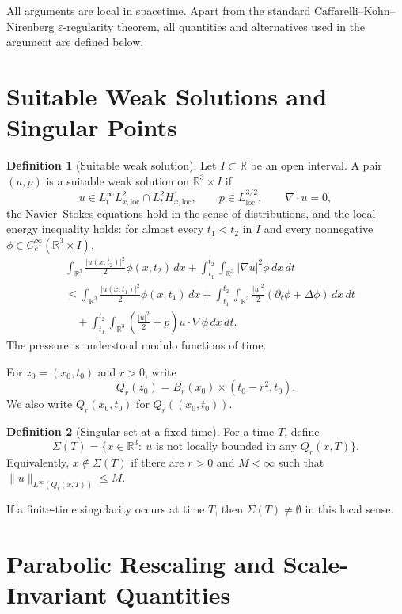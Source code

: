 \documentclass[11pt]{amsart}
\theoremstyle{plain}
\theoremstyle{definition}
\newtheorem{definition}[definition]{Definition}
\theoremstyle{remark}
\begin{document}
All arguments are local in spacetime.  Apart from the standard
Caffarelli--Kohn--Nirenberg \(\varepsilon\)-regularity theorem, all quantities
and alternatives used in the argument are defined below.

\section{Suitable Weak Solutions and Singular Points}

\begin{definition}[Suitable weak solution]
Let \(I\subset\mathbb R\) be an open interval.  A pair \((u,p)\) is a suitable
weak solution on \(\mathbb R^3\times I\) if
\[
  u\in L^\infty_tL^2_{x,\mathrm{loc}}
  \cap L^2_tH^1_{x,\mathrm{loc}},
  \qquad
  p\in L^{3/2}_{\mathrm{loc}},
  \qquad
  \nabla\cdot u=0,
\]
the Navier--Stokes equations hold in the sense of distributions, and the local
energy inequality holds: for almost every \(t_1<t_2\) in \(I\) and every
nonnegative \(\phi\in C_c^\infty(\mathbb R^3\times I)\),
\[
\begin{aligned}
&\int_{\mathbb R^3}\frac{|u(x,t_2)|^2}{2}\phi(x,t_2)\,dx
 +\int_{t_1}^{t_2}\int_{\mathbb R^3}|\nabla u|^2\phi\,dx\,dt \\
&\le
 \int_{\mathbb R^3}\frac{|u(x,t_1)|^2}{2}\phi(x,t_1)\,dx
 +\int_{t_1}^{t_2}\int_{\mathbb R^3}
   \frac{|u|^2}{2}(\partial_t\phi+\Delta\phi)\,dx\,dt \\
&\quad
 +\int_{t_1}^{t_2}\int_{\mathbb R^3}
   \left(\frac{|u|^2}{2}+p\right)u\cdot\nabla\phi\,dx\,dt .
\end{aligned}
\]
The pressure is understood modulo functions of time.
\end{definition}

For \(z_0=(x_0,t_0)\) and \(r>0\), write
\[
  Q_r(z_0)=B_r(x_0)\times(t_0-r^2,t_0).
\]
We also write \(Q_r(x_0,t_0)\) for \(Q_r((x_0,t_0))\).

\begin{definition}[Singular set at a fixed time]
For a time \(T\), define
\[
  \Sigma(T)=
  \{x\in\mathbb R^3:\ u\text{ is not locally bounded in any }
  Q_r(x,T)\}.
\]
Equivalently, \(x\notin\Sigma(T)\) if there are \(r>0\) and \(M<\infty\) such
that \(\|u\|_{L^\infty(Q_r(x,T))}\le M\).
\end{definition}

If a finite-time singularity occurs at time \(T\), then
\(\Sigma(T)\ne\emptyset\) in this local sense.

\section{Parabolic Rescaling and Scale-Invariant Quantities}
\end{document}
